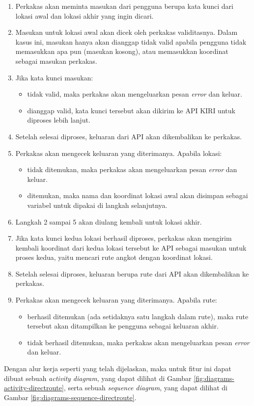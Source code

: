 \begin{enumerate}
	\item Perkakas akan meminta masukan dari pengguna berupa kata kunci dari lokasi awal dan lokasi akhir yang ingin dicari.
	\item Masukan untuk lokasi awal akan dicek oleh perkakas validitasnya. Dalam kasus ini, masukan hanya akan dianggap tidak valid apabila pengguna tidak memasukkan apa pun (masukan kosong), atau memasukkan koordinat \latlon\xspace sebagai masukan perkakas.
	\item Jika kata kunci masukan:
	
	\begin{itemize}
		\item tidak valid, maka perkakas akan mengeluarkan pesan \textit{error} dan keluar.
		\item dianggap valid, kata kunci tersebut akan dikirim ke API KIRI untuk diproses lebih lanjut.
	\end{itemize}
	 
	\item Setelah selesai diproses, keluaran dari API akan dikembalikan ke perkakas.
	\item Perkakas akan mengecek keluaran yang diterimanya. Apabila lokasi:
	
	\begin{itemize}
		\item tidak ditemukan, maka perkakas akan mengeluarkan pesan \textit{error} dan keluar.
		\item ditemukan, maka nama dan koordinat \latlon\xspace lokasi awal akan disimpan sebagai variabel untuk dipakai di langkah selanjutnya.
	\end{itemize}
	
	\item Langkah 2 sampai 5 akan diulang kembali untuk lokasi akhir.
	\item Jika kata kunci kedua lokasi berhasil diproses, perkakas akan mengirim kembali koordinat \latlon\xspace dari kedua lokasi tersebut ke API sebagai masukan untuk proses kedua, yaitu mencari rute angkot dengan koordinat \latlon lokasi.
	\item Setelah selesai diproses, keluaran berupa rute dari API akan dikembalikan ke perkakas.
	\item Perkakas akan mengecek keluaran yang diterimanya. Apabila rute:
	
	\begin{itemize}
		\item berhasil ditemukan (ada setidaknya satu langkah dalam rute), maka rute tersebut akan ditampilkan ke pengguna sebagai keluaran akhir.
		\item tidak berhasil ditemukan, maka perkakas akan mengeluarkan pesan \textit{error} dan keluar.
	\end{itemize}
	
\end{enumerate}
\noindent
Dengan alur kerja seperti yang telah dijelaskan, maka untuk fitur ini dapat dibuat sebuah \textit{activity diagram}, yang dapat dilihat di Gambar \ref{fig:diagrams-activity-directroute}, serta sebuah \textit{sequence diagram}, yang dapat dilihat di Gambar \ref{fig:diagrams-sequence-directroute}.

